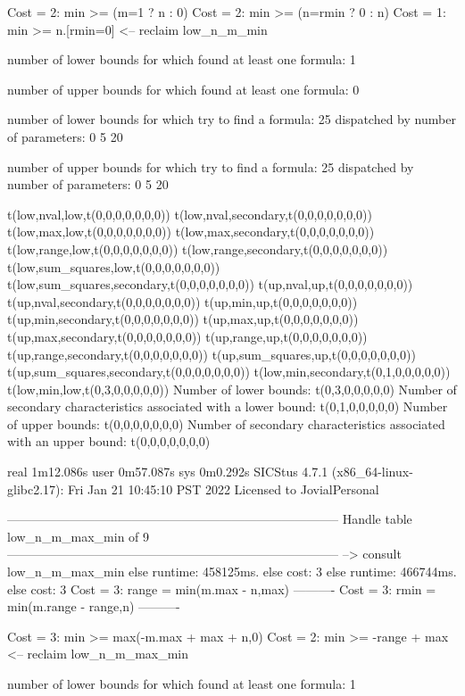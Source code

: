 Cost =  2:  min >= (m=1 ? n : 0)
Cost =  2:  min >= (n=rmin ? 0 : n)
Cost =  1:  min >= n.[rmin=0] %
<-- reclaim low_n_m_min

number of lower bounds for which found at least one formula: 1

number of upper bounds for which found at least one formula: 0

number of lower bounds for which try to find a formula: 25
dispatched by number of parameters: 0  5  20

number of upper bounds for which try to find a formula: 25
dispatched by number of parameters: 0  5  20

t(low,nval,low,t(0,0,0,0,0,0,0))
t(low,nval,secondary,t(0,0,0,0,0,0,0))
t(low,max,low,t(0,0,0,0,0,0,0))
t(low,max,secondary,t(0,0,0,0,0,0,0))
t(low,range,low,t(0,0,0,0,0,0,0))
t(low,range,secondary,t(0,0,0,0,0,0,0))
t(low,sum_squares,low,t(0,0,0,0,0,0,0))
t(low,sum_squares,secondary,t(0,0,0,0,0,0,0))
t(up,nval,up,t(0,0,0,0,0,0,0))
t(up,nval,secondary,t(0,0,0,0,0,0,0))
t(up,min,up,t(0,0,0,0,0,0,0))
t(up,min,secondary,t(0,0,0,0,0,0,0))
t(up,max,up,t(0,0,0,0,0,0,0))
t(up,max,secondary,t(0,0,0,0,0,0,0))
t(up,range,up,t(0,0,0,0,0,0,0))
t(up,range,secondary,t(0,0,0,0,0,0,0))
t(up,sum_squares,up,t(0,0,0,0,0,0,0))
t(up,sum_squares,secondary,t(0,0,0,0,0,0,0))
t(low,min,secondary,t(0,1,0,0,0,0,0))
t(low,min,low,t(0,3,0,0,0,0,0))
Number of lower bounds:                                             t(0,3,0,0,0,0,0)
Number of secondary characteristics associated with a lower bound:  t(0,1,0,0,0,0,0)
Number of upper bounds:                                             t(0,0,0,0,0,0,0)
Number of secondary characteristics associated with an upper bound: t(0,0,0,0,0,0,0)

real	1m12.086s
user	0m57.087s
sys	0m0.292s
SICStus 4.7.1 (x86_64-linux-glibc2.17): Fri Jan 21 10:45:10 PST 2022
Licensed to JovialPersonal


--------------------------------------------------------------------------------
Handle table low_n_m_max_min of 9
--------------------------------------------------------------------------------
--> consult low_n_m_max_min
else runtime: 458125ms. else cost: 3
else runtime: 466744ms. else cost: 3
Cost =  3:  range = min(m.max - n,max) %
----------
Cost =  3:  rmin  = min(m.range - range,n)
----------

Cost =  3:  min >= max(-m.max + max + n,0)
Cost =  2:  min >= -range + max
<-- reclaim low_n_m_max_min

number of lower bounds for which found at least one formula: 1

